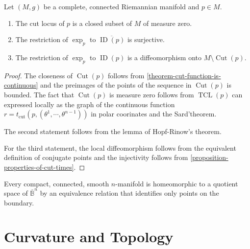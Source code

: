 \begin{theorem}
  \label{theorem-tangent-cut-locus-and-injective-domain}
  Let \( (M, g) \) be a complete, connected Riemannian manifold and \( p \in M \).
  \begin{enumerate}
    \item The cut locus of \( p \) is a closed subset of \( M \) of measure zero.
    \item The restriction of \( \exp_p \) to \( \overline{\operatorname{ID}(p)} \) is surjective.
    \item The restriction of \( \exp_p \) to \( \operatorname{ID}(p) \) is a diffeomorphism onto \( M \setminus \operatorname{Cut}(p) \).
  \end{enumerate}
\end{theorem}
\begin{proof}
  The closeness of \( \operatorname{Cut}(p) \) follows from \ref{theorem-cut-function-is-continuous} and the preimages of the points of the sequence in \( \operatorname{Cut}(p) \) is bounded.
  The fact that \( \operatorname{Cut}(p) \) is measure zero follows from \( \operatorname{TCL}(p) \) can expressed locally as the graph of the continuous function \( r = t_{\text{cut}}(p, (\theta^1, \cdots, \theta^{n - 1})) \) in polar coorinates and the Sard'theorem. %

  The second statement follows from the lemma of Hopf-Rinow's theorem. %

  For the third statement, the local diffeomorphism follows from the equivalent definition of conjugate points and the injectivity follows from \ref{proposition-properties-of-cut-times}. %
\end{proof}

\begin{corollary}
  \label{corollary-compact-connected-manifold-as-quotient-of-ball}
  Every compact, connected, smooth \( n \)-manifold is homeomorphic to a quotient space of \( \overline{\mathbb{B}}^n \) by an equivalence relation that identifies only points on the boundary.
\end{corollary}


\section{Curvature and Topology}
\label{section-curvature-and-topology}

